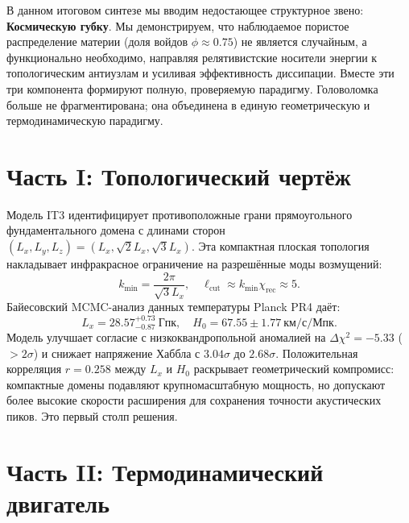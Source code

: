 \documentclass[12pt,a4paper]{article}
\begin{document}
В данном итоговом синтезе мы вводим недостающее структурное звено: \textbf{Космическую губку}. Мы демонстрируем, что наблюдаемое пористое распределение материи (доля войдов $\phi \approx 0.75$) не является случайным, а функционально необходимо, направляя релятивистские носители энергии к топологическим антиузлам и усиливая эффективность диссипации. Вместе эти три компонента формируют полную, проверяемую парадигму. Головоломка больше не фрагментирована; она объединена в единую геометрическую и термодинамическую парадигму.

\section{Часть I: Топологический чертёж}

Модель IT3 идентифицирует противоположные грани прямоугольного фундаментального домена с длинами сторон $(L_x, L_y, L_z) = (L_x, \sqrt{2}L_x, \sqrt{3}L_x)$. Эта компактная плоская топология накладывает инфракрасное ограничение на разрешённые моды возмущений:
\begin{equation}
k_{\min} = \frac{2\pi}{\sqrt{3}L_x}, \quad \ell_{\text{cut}} \approx k_{\min} \chi_{\text{rec}} \approx 5.
\end{equation}
Байесовский MCMC-анализ данных температуры Planck PR4 даёт:
\begin{equation}
L_x = 28.57^{+0.73}_{-0.87}~\text{Гпк}, \quad H_0 = 67.55 \pm 1.77~\text{км/с/Мпк}.
\end{equation}
Модель улучшает согласие с низкоквандропольной аномалией на $\Delta\chi^2 = -5.33$ ($>2\sigma$) и снижает напряжение Хаббла с $3.04\sigma$ до $2.68\sigma$. Положительная корреляция $r = 0.258$ между $L_x$ и $H_0$ раскрывает геометрический компромисс: компактные домены подавляют крупномасштабную мощность, но допускают более высокие скорости расширения для сохранения точности акустических пиков. Это первый столп решения.

\section{Часть II: Термодинамический двигатель}
\end{document}
